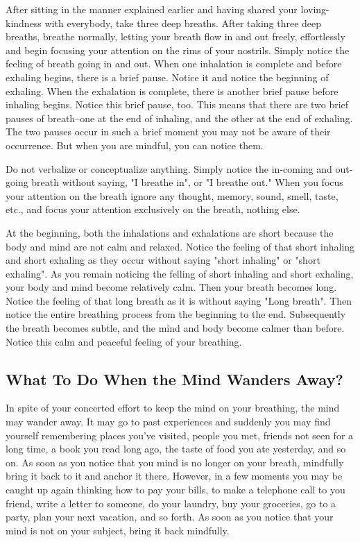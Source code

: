After sitting in the manner explained earlier and having shared your
loving-kindness with everybody, take three deep breaths. After taking three deep
breaths, breathe normally, letting your breath flow in and out freely,
effortlessly and begin focusing your attention on the rims of your nostrils.
Simply notice the feeling of breath going in and out. When one inhalation is
complete and before exhaling begins, there is a brief pause. Notice it and
notice the beginning of exhaling. When the exhalation is complete, there is
another brief pause before inhaling begins. Notice this brief pause, too. This
means that there are two brief pauses of breath--one at the end of inhaling, and
the other at the end of exhaling. The two pauses occur in such a brief moment
you may not be aware of their occurrence. But when you are mindful, you can
notice them.

Do not verbalize or conceptualize anything. Simply notice the in-coming and
out-going breath without saying, "I breathe in", or "I breathe out." When you
focus your attention on the breath ignore any thought, memory, sound, smell,
taste, etc., and focus your attention exclusively on the breath, nothing else.

At the beginning, both the inhalations and exhalations are short because the
body and mind are not calm and relaxed. Notice the feeling of that short
inhaling and short exhaling as they occur without saying "short inhaling" or
"short exhaling". As you remain noticing the felling of short inhaling and short
exhaling, your body and mind become relatively calm. Then your breath becomes
long. Notice the feeling of that long breath as it is without saying "Long
breath". Then notice the entire breathing process from the beginning to the end.
Subsequently the breath becomes subtle, and the mind and body become calmer than
before. Notice this calm and peaceful feeling of your breathing.

\subsection*{What To Do When the Mind Wanders Away?}
In spite of your concerted effort to
keep the mind on your breathing, the mind may wander away. It may go to past
experiences and suddenly you may find yourself remembering places you've
visited, people you met, friends not seen for a long time, a book you read long
ago, the taste of food you ate yesterday, and so on. As soon as you notice that
you mind is no longer on your breath, mindfully bring it back to it and anchor
it there. However, in a few moments you may be caught up again thinking how to
pay your bills, to make a telephone call to you friend, write a letter to
someone, do your laundry, buy your groceries, go to a party, plan your next vacation, and so
forth. As soon as you notice that your mind is not on your subject, bring it
back mindfully.

